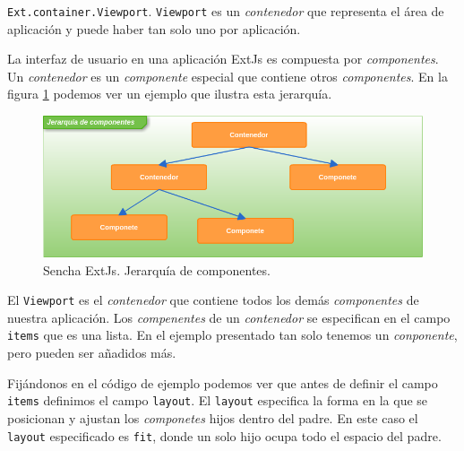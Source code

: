 	\texttt{Ext.container.Viewport}. \texttt{Viewport} es un \emph{contenedor} que representa el área de aplicación y puede haber tan solo uno por
	aplicación. 
 	\par
 	La interfaz de usuario en una aplicación ExtJs es compuesta por \emph{componentes}. Un \emph{contenedor} es un \emph{componente} especial que
	contiene otros \emph{componentes}. En la figura \ref{fig:comps} podemos ver un ejemplo que ilustra esta jerarquía.
	\begin{figure}[h]
		\centering
		\includegraphics[keepaspectratio, width=1\textwidth]{./img/comps.png}
		\caption{Sencha ExtJs. Jerarquía de componentes.}   
		\label{fig:comps}
	\end{figure}
 	\par
 	El \texttt{Viewport} es el \emph{contenedor} que contiene todos los demás \emph{componentes} de nuestra aplicación. Los \emph{compenentes} de
	un \emph{contenedor} se especifican en el campo \texttt{items} que es una lista. En el ejemplo presentado tan solo tenemos un 
	\emph{conponente}, pero pueden ser añadidos más.
 	\par
 	Fijándonos en el código de ejemplo podemos ver que antes de definir el campo \texttt{items} definimos el campo \texttt{layout}. El \texttt{layout}
	especifica la forma en la que se posicionan y ajustan los \emph{componetes} hijos dentro del padre. En este caso el \texttt{layout} especificado es 
	\texttt{\cc fit\cc}, donde un solo hijo ocupa todo el espacio del padre.
